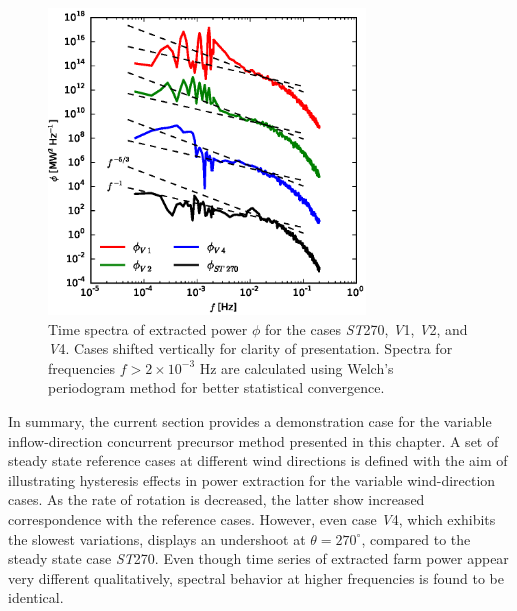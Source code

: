 		\begin{figure}[ht]
			\centering
			\includegraphics[width=0.75\textwidth]{chapters/turbulent_inflow/blm/figure14.eps}
			\caption{Time spectra of extracted power $\phi$ for the cases \emph{ST}270, \emph{V}1, \emph{V}2, and \emph{V}4. Cases shifted vertically for clarity of presentation. Spectra for frequencies $f > 2 \times 10^{-3}$ Hz are calculated using Welch's periodogram method for better statistical convergence. }
			\label{fig:spectra_power}
		\end{figure}
		
		
		In summary, the current section provides a demonstration case for the variable inflow-direction concurrent precursor method presented in this chapter. A set of steady state reference cases at different wind directions is defined with the aim of illustrating hysteresis effects in power extraction for the variable wind-direction cases. As the rate of rotation is decreased, the latter show increased correspondence with the reference cases. However, even case \emph{V}4, which exhibits the slowest variations, displays an undershoot at $\theta = 270^\circ$, compared to the steady state case \emph{ST}270. Even though time series of extracted farm power appear very different qualitatively, spectral behavior at higher frequencies is found to be identical.
		
		
